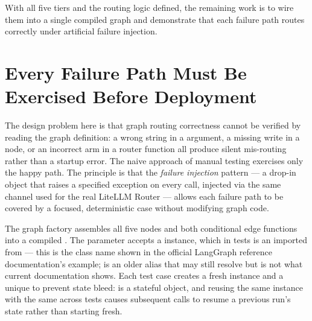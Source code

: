 With all five tiers and the routing logic defined, the remaining work is to
wire them into a single compiled graph and demonstrate that each failure
path routes correctly under artificial failure injection.

\section{Every Failure Path Must Be Exercised Before Deployment}
\label{sec:capstone-resilient-agent}

The design problem here is that graph routing correctness cannot be verified
by reading the graph definition: a wrong string in a 
argument, a missing  write in a node, or an incorrect
 arm in a router function all produce silent mis-routing rather
than a startup error. The naive approach of manual testing exercises only
the happy path. The principle is that the \emph{failure injection} pattern
--- a drop-in  object that raises a specified exception
on every  call, injected via the same 
channel used for the real LiteLLM Router --- allows each failure path to be
covered by a focused, deterministic  case without modifying
graph code.

The graph factory assembles all five nodes and both conditional edge
functions into a compiled . The 
parameter accepts a  instance, which in tests is
an  imported from  ---
this is the class name shown in the official LangGraph reference
documentation's  example;  is an older
alias that may still resolve but is not what current documentation shows.
Each test case creates a fresh  instance and a unique
 to prevent state bleed:  is a
stateful object, and reusing the same instance with the same
 across tests causes subsequent  calls to
resume a previous run's state rather than starting fresh.


